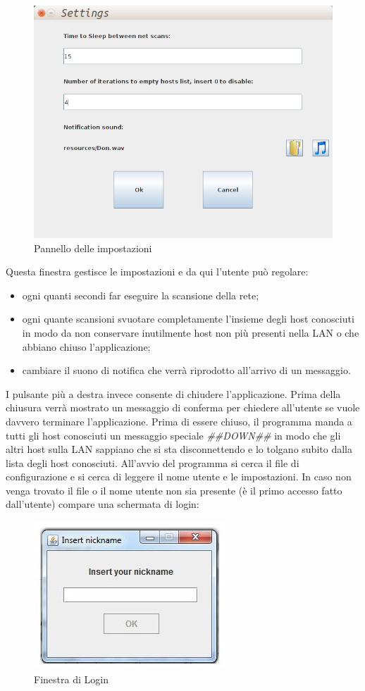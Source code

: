 \begin{figure}[t]
\centering
\includegraphics[scale=0.3]{settings.png}
\caption{Pannello delle impostazioni\label{fig:settings}}
\end{figure}
Questa finestra gestisce le impostazioni e da qui l'utente può regolare:
\begin{itemize}
	\item ogni quanti secondi far eseguire la scansione della rete;
	\item ogni quante scansioni svuotare completamente l'insieme degli host conosciuti 
	in modo da non conservare inutilmente host non più presenti nella LAN o che abbiano
	chiuso l'applicazione;
	\item cambiare il suono di notifica che verrà riprodotto all'arrivo di un messaggio.
\end{itemize}
I pulsante più a destra invece consente di chiudere l'applicazione. Prima della
chiusura verrà mostrato un messaggio di conferma per chiedere all'utente se vuole davvero terminare
l'applicazione. Prima di essere chiuso, il programma manda a tutti gli host conosciuti
un messaggio speciale \emph{\#\#DOWN\#\#} in modo che gli altri host sulla LAN sappiano che si
sta disconnettendo e lo tolgano subito dalla lista degli host conosciuti.
All'avvio del programma si cerca il file di configurazione e si cerca di
leggere il nome utente e le impostazioni. In caso non venga trovato il file o il nome utente
non sia presente (è il primo accesso fatto dall'utente) compare una schermata di login:
\begin{figure}[h]
\centering
\includegraphics[scale=0.5]{login1.jpg}
\caption{Finestra di Login\label{fig:login}}
\end{figure}

